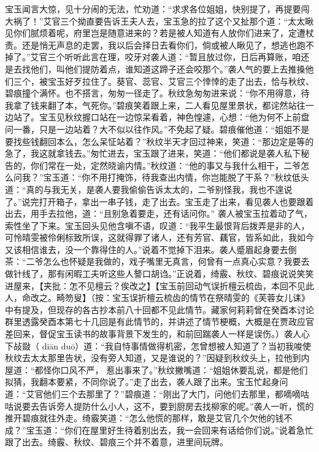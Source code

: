 \documentclass[12pt,oneside]{book}
\begin{document}
宝玉闻言大惊，见十分闹的无法，忙劝道：“求求各位姐姐，快别提了，再提要闯大祸了！”艾官三个拗直要告诉王夫人去，宝玉急的拉了这个又扯那个道：“太太瞅见你们腻烦着呢，府里岂是随意进来的？若是被人知道有人放你们进来了，定遭杖责。还是悄无声息的走罢，我以后会择日去看你们，倘或被人瞅见了，想逃也跑不掉了。”艾官三个听听此言在理，咬牙对袭人道：“暂且放过你，日后再算账，咱还是去找他们，叫他们提防着点，谁知道这蹄子还会咬那个。”袭人气的要上去推搡他们三个，被宝玉好歹拉住了。葵官、蕊官、艾官三个悻悻的走了出去，恰与秋纹、碧痕撞个满怀。也不搭言，匆匆一径走了。秋纹急匆匆进来说：“你不用得意，待我拿了钱来翻了本，气死你。”碧痕笑着跟上来，二人看见屋里景状，都诧然站往一边站了。宝玉见秋纹握口站在一边惊呆看着，神色惶遽，心想：“他为何不上前盘问一番，只是一边站着？大不似以往作风。”不免起了疑。碧痕催他道：“姐姐不是要找些钱翻回本么，怎么呆怔站着？”秋纹半天才回过神来，笑道：“那边定是等的急了，我这就拿钱去。”匆忙进去，宝玉跟了进来，笑道：“他们都说是袭人私下秘告的，你们常在一处，定然晓谕内情。”秋纹道：“他的事又与我什么相干，二爷怎么问我？”宝玉道：“你不用打掩饰，待我查出内情，你岂能脱了干系？”秋纹低头道：“真的与我无关，是袭人要我偷偷告诉太太的，二爷别怪我，我也不遑说了。”说完打开箱子，拿出一串子钱，走了出去。宝玉走了出来，看见袭人也要跟着出去，用手去拉他，道：“且别急着要走，还有话问你。”
袭人被宝玉拉着动了气，索性坐了下来。宝玉回头见他含嗔不语，叹道：“我平生最恨背后拨弄是非的人，可怜晴雯被伶俐标致所误，这就得罪了诸人，还有芳官、藕官，皆系如此，我如今又该相信谁去，没一个靠得住的人。”说着不觉掉下泪来。袭人蹙眉起身要去倒茶：“二爷怎么也怀疑是我做的，戏子嘴里无真言，何曾有一点真心实意？我要去做针线了，那有闲暇工夫听这些人謷口胡诌。”正说着，绮霰、秋纹、碧痕说说笑笑进屋来，【夹批：怎不见檀云？俟改之】【宝玉前回动气误折檀云梳齿，本回不见此人，命改之。畸笏叟】（按：宝玉误折檀云梳齿的情节在祭晴雯的《芙蓉女儿诔》中有提及，但现存的各古抄本前八十回都不见此情节。藏家何莉莉曾在癸酉本讨论群里透露癸酉本第七十几回是有此情节的，并讲述了情节梗概，大概是在贾政应官差回来，督促宝玉读书的故事背景下发生的，和前回踹袭人一样是误伤。）袭人心下敁敠（ diān duō）道：“我自恃事情做得机密，怎曾想被人知道了？当初我唆使秋纹去太太那里告状，没有旁人知道，又是谁说的？”因疑到秋纹头上，拉他到内屋道：“都怪你口风不严， 惹出事来了。”秋纹撇嘴道：“姐姐休要乱说，都是他们拟猜，我翻本要紧，不同你说了。”走了出去，袭人跟了出来。宝玉忙起身问道：“艾官他们三个去那里了？”碧痕道：“刚出了大门，问他们去那里，都嘀嘀咕咕说要去告诉旁人提防什么小人，这不，要到厨房去找柳家的呢。”袭人一听，慌的推开碧痕就往外走。绮霰笑道：“怎么他慌的那样，敢是艾官几个欠他的钱不成？”宝玉道：“你们在屋里好生待着别出去，我一会回来有话给你们说。”说着急忙跟了出去。绮霰、秋纹、碧痕三个并不着意，进里间玩牌。
\end{document}
